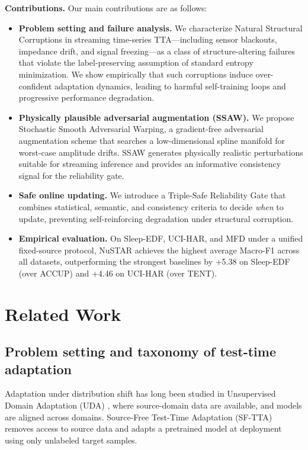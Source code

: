\documentclass[sigconf, screen, review, anonymous]{acmart}
\theoremstyle{plain}
\theoremstyle{definition}
\theoremstyle{remark}
\begin{document}
\textbf{Contributions.} Our main contributions are as follows:

\begin{itemize}
	\item \textbf{Problem setting and failure analysis.}
	We characterize Natural Structural Corruptions in streaming
	time-series TTA---including sensor blackouts, impedance drift, and
	signal freezing---as a class of structure-altering failures that
	violate the label-preserving assumption of standard entropy
	minimization. We show empirically that such corruptions induce
	over-confident adaptation dynamics, leading to harmful self-training
	loops and progressive performance degradation.

	\item \textbf{Physically plausible adversarial augmentation (SSAW).}
	We propose Stochastic Smooth Adversarial Warping, a gradient-free
	adversarial augmentation scheme that searches a low-dimensional spline
	manifold for worst-case amplitude drifts. SSAW generates physically
	realistic perturbations suitable for streaming inference and provides
	an informative consistency signal for the reliability gate.

	\item \textbf{Safe online updating.}
	We introduce a Triple-Safe Reliability Gate that combines statistical,
	semantic, and consistency criteria to decide \emph{when} to update,
	preventing self-reinforcing degradation under structural corruption.

	\item \textbf{Empirical evaluation.}
	On Sleep-EDF, UCI-HAR, and MFD under a unified fixed-source protocol,
	NuSTAR achieves the highest average Macro-F1 across all datasets,
	outperforming the strongest baselines by +5.38 on Sleep-EDF (over
	ACCUP) and +4.46 on UCI-HAR (over TENT).
\end{itemize}


\section{Related Work}
\label{sec:related}

\subsection{Problem setting and taxonomy of test-time adaptation}
Adaptation under distribution shift has long been studied in Unsupervised Domain Adaptation (UDA) \citep{ganin2016domain, long2015learning}, where source-domain data are available, and models are aligned across domains. Source-Free Test-Time Adaptation (SF-TTA) \citep{liang2020shot} removes access to source data and adapts a pretrained model at deployment using only unlabeled target samples.
\end{document}
